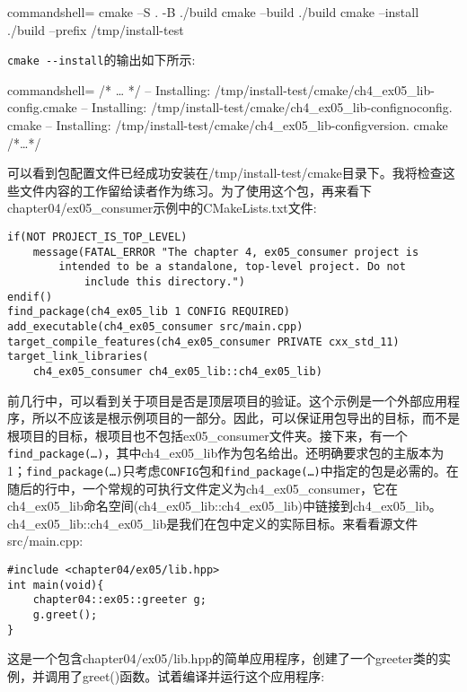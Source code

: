 \begin{tcblisting}{commandshell={}}
cmake –S . -B ./build
cmake --build ./build
cmake --install ./build --prefix /tmp/install-test
\end{tcblisting}

\texttt{cmake -{}-install}的输出如下所示:

\begin{tcblisting}{commandshell={}}
/* … */
-- Installing: /tmp/install-test/cmake/ch4_ex05_lib-config.cmake
-- Installing: /tmp/install-test/cmake/ch4_ex05_lib-confignoconfig.
cmake
-- Installing: /tmp/install-test/cmake/ch4_ex05_lib-configversion.
cmake
/*…*/
\end{tcblisting}

可以看到包配置文件已经成功安装在/tmp/install-test/cmake目录下。我将检查这些文件内容的工作留给读者作为练习。为了使用这个包，再来看下chapter04/ex05\_consumer示例中的CMakeLists.txt文件:

\begin{lstlisting}[style=styleCMake]
if(NOT PROJECT_IS_TOP_LEVEL)
	message(FATAL_ERROR "The chapter 4, ex05_consumer project is
		intended to be a standalone, top-level project. Do not
			include this directory.")
endif()
find_package(ch4_ex05_lib 1 CONFIG REQUIRED)
add_executable(ch4_ex05_consumer src/main.cpp)
target_compile_features(ch4_ex05_consumer PRIVATE cxx_std_11)
target_link_libraries(
	ch4_ex05_consumer ch4_ex05_lib::ch4_ex05_lib)
\end{lstlisting}

前几行中，可以看到关于项目是否是顶层项目的验证。这个示例是一个外部应用程序，所以不应该是根示例项目的一部分。因此，可以保证用包导出的目标，而不是根项目的目标，根项目也不包括ex05\_consumer文件夹。接下来，有一个\texttt{find\_package(…)}，其中ch4\_ex05\_lib作为包名给出。还明确要求包的主版本为1；\texttt{find\_package(…)}只考虑\texttt{CONFIG}包和\texttt{find\_package(…)}中指定的包是必需的。在随后的行中，一个常规的可执行文件定义为ch4\_ex05\_consumer，它在ch4\_ex05\_lib命名空间(ch4\_ex05\_lib::ch4\_ex05\_lib)中链接到ch4\_ex05\_lib。ch4\_ex05\_lib::ch4\_ex05\_lib是我们在包中定义的实际目标。来看看源文件src/main.cpp:

\begin{lstlisting}[style=styleCXX]
#include <chapter04/ex05/lib.hpp>
int main(void){
	chapter04::ex05::greeter g;
	g.greet();
}
\end{lstlisting}

这是一个包含chapter04/ex05/lib.hpp的简单应用程序，创建了一个greeter类的实例，并调用了greet()函数。试着编译并运行这个应用程序:

